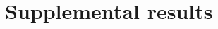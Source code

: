 \clearpage
\section*{Supplemental results}

\setcounter{table}{0}
\renewcommand{\thetable}{S\arabic{table}}
\setcounter{figure}{0}
\renewcommand{\thefigure}{S\arabic{figure}}

% 
%  


